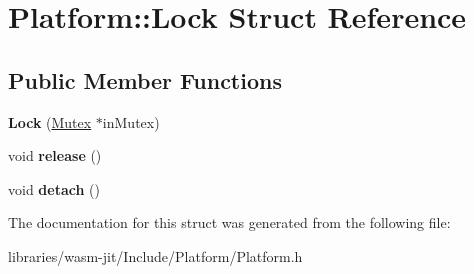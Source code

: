 \hypertarget{struct_platform_1_1_lock}{}\section{Platform\+:\+:Lock Struct Reference}
\label{struct_platform_1_1_lock}
\subsection*{Public Member Functions}
\begin{DoxyCompactItemize}
\item 
\mbox{\label{struct_platform_1_1_lock_aa81303a94d396d303d8a662ab70c4fee}} 
{\bfseries Lock} (\mbox{\hyperlink{struct_platform_1_1_mutex}{Mutex}} $\ast$in\+Mutex)
\item 
\mbox{\label{struct_platform_1_1_lock_ab5bd4b44fa429d9d913dcf2aea86795a}} 
void {\bfseries release} ()
\item 
\mbox{\label{struct_platform_1_1_lock_aff1e72b3c713293e1f42306bd02f96df}} 
void {\bfseries detach} ()
\end{DoxyCompactItemize}


The documentation for this struct was generated from the following file\+:\begin{DoxyCompactItemize}
\item 
libraries/wasm-\/jit/\+Include/\+Platform/Platform.\+h\end{DoxyCompactItemize}
